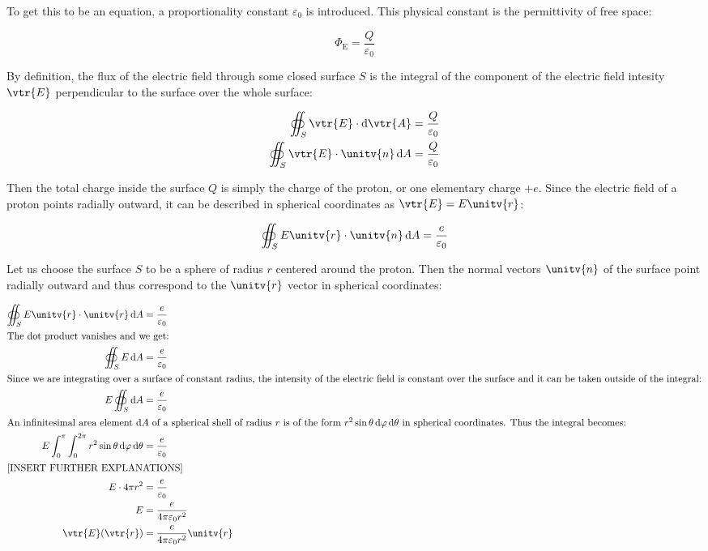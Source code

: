 \documentclass{article}
\begin{document}
    To get this to be an equation, a proportionality constant $\varepsilon_{0}$ is introduced. This physical constant is the permittivity of free space:

    \begin{equation}
        \Phi_{\mathrm{E}} = \frac{Q}{\varepsilon_{0}} 
    \end{equation}

    By definition, the flux of the electric field through some closed surface $S$ is the integral of the component of the electric field intesity $\vtr{E}$
    perpendicular to the surface over the whole surface:

    \begin{align}
        \oiint_{S}\vtr{E}\cdot \odif{\vtr{A}} &= \frac{Q}{\varepsilon_{0}} \\
        \oiint_{S}\vtr{E}\cdot \unitv{n}\odif{A} &= \frac{Q}{\varepsilon_{0}}
    \end{align}

    Then the total charge inside the surface $Q$ is simply the charge of the proton, or one elementary charge $+e$.
    Since the electric field of a proton points radially outward, it can be described in spherical coordinates as $\vtr{E} = E\unitv{r}$:

    \begin{equation}
        \oiint_{S}E\unitv{r}\cdot \unitv{n}\odif{A} = \frac{e}{\varepsilon_{0}}
    \end{equation}

    Let us choose the surface $S$ to be a sphere of radius $r$ centered around the proton. Then the normal vectors $\unitv{n}$ of the surface point
    radially outward and thus correspond to the $\unitv{r}$ vector in spherical coordinates:

    \begin{align}
        \oiint_{S}E\unitv{r}\cdot \unitv{r}\odif{A} &= \frac{e}{\varepsilon_{0}} \\
        \intertext{The dot product vanishes and we get:}
        \oiint_{S}E\odif{A} &= \frac{e}{\varepsilon_{0}} \\
        \intertext{Since we are integrating over a surface of constant radius, the intensity of the electric field is constant over the surface and it can be taken outside of the integral:}
        E\oiint_{S}\odif{A} &= \frac{e}{\varepsilon_{0}} \\
        \intertext{An infinitesimal area element $\odif{A}$ of a spherical shell of radius $r$ is of the form $r^2\sin\theta\odif{\varphi,\theta}$ in spherical coordinates. Thus the integral becomes:}
        E\int_{0}^{\pi}\int_{0}^{2\pi}r^2\sin\theta\odif{\varphi,\theta} &= \frac{e}{\varepsilon_{0}} \\
        \intertext{[INSERT FURTHER EXPLANATIONS]}
        E \cdot 4\pi r^2 &= \frac{e}{\varepsilon_{0}} \\
        E &= \frac{e}{4\pi\varepsilon_{0}r^2} \\
        \vtr{E}(\vtr{r}) &= \frac{e}{4\pi\varepsilon_{0}r^2}\unitv{r}
    \end{align}
\end{document}
